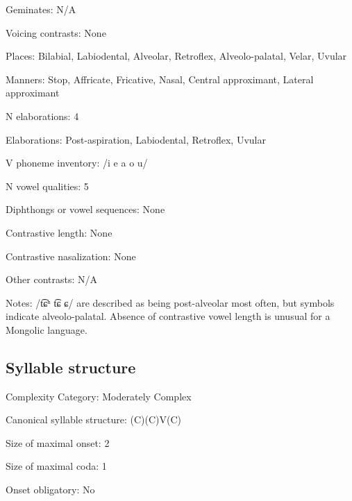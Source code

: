 {\begin{appendixdesc}
\item[Geminates:] N/A

\item[Voicing contrasts:] None

\item[Places:] Bilabial, Labiodental, Alveolar, Retroflex, Alveolo-palatal, Velar, Uvular

\item[Manners:] Stop, Affricate, Fricative, Nasal, Central approximant, Lateral approximant

\item[N elaborations:] 4

\item[Elaborations:] Post-aspiration, Labiodental, Retroflex, Uvular

\item[V phoneme inventory:] /i e a o u/

\item[N vowel qualities:] 5

\item[Diphthongs or vowel sequences:] None

\item[Contrastive length:] None

\item[Contrastive nasalization:] None

\item[Other contrasts:] N/A

\item[Notes:] /t͡ɕʰ t͡ɕ ɕ/ are described as being post-alveolar most often, but symbols indicate alveolo-palatal. Absence of contrastive vowel length is unusual for a Mongolic language.
\end{appendixdesc}
\subsection*{Syllable structure}
\begin{appendixdesc}

\item[Complexity Category:] Moderately Complex

\item[Canonical syllable structure:] (C)(C)V(C) \citep[54--72]{Slater2003}

\item[Size of maximal onset:] 2

\item[Size of maximal coda:] 1

\item[Onset obligatory:] No


\end{appendixdesc}}
